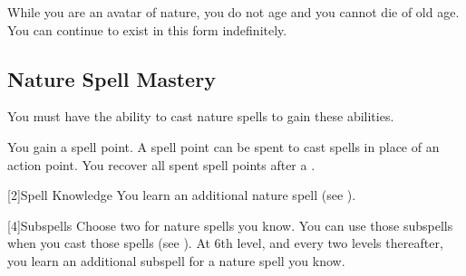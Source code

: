         While you are an avatar of nature, you do not age and you cannot die of old age.
        You can continue to exist in this form indefinitely.

    \subsection{Nature Spell Mastery}
        You must have the ability to cast nature spells to gain these abilities.

        You gain a spell point.
        A spell point can be spent to cast spells in place of an action point.
        You recover all spent spell points after a .

        [2]{Spell Knowledge} 
        You learn an additional nature spell (see ).

        [4]{Subspells}
        Choose two  for nature spells you know.
        You can use those subspells when you cast those spells (see ).
        At 6th level, and every two levels thereafter, you learn an additional subspell for a nature spell you know.

